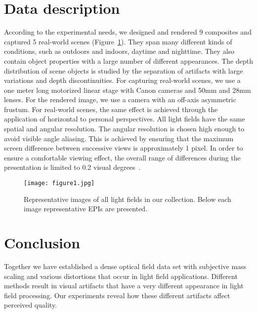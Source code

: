 \documentclass[10pt,twocolumn,letterpaper]{article}
\begin{document}
\section{Data description}
According to the experimental needs, we designed and rendered 9 composites and captured 5 real-world scenes (Figure~\ref{pic1}). They span many different kinds of conditions, such as outdoors and indoors, daytime and nighttime. They also contain object properties with a large number of different appearances. The depth distribution of scene objects is studied by the separation of artifacts with large variations and depth discontinuities. For capturing real-world scenes, we use a one meter long motorized linear stage with Canon cameras and 50mm and 28mm lenses. For the rendered image, we use a camera with an off-axis asymmetric frustum. For real-world scenes, the same effect is achieved through the application of horizontal to personal perspectives. All light fields have the same spatial and angular resolution. The angular resolution is chosen high enough to avoid visible angle aliasing. This is achieved by ensuring that the maximum screen difference between successive views is approximately 1 pixel. In order to ensure a comfortable viewing effect, the overall range of differences during the presentation is limited to 0.2 visual degrees~\cite{Shibata_2011_The}.
\begin{figure}
	\centering
	\texttt{[image: figure1.jpg]}
	\caption{Representative images of all light fields in our collection. Below each image representative EPIs are presented.}\label{pic1}
\end{figure}
\section{Conclusion}
Together we have established a dense optical field data set with subjective mass scaling and various distortions that occur in light field applications. Different methods result in visual artifacts that have a very different appearance in light field processing. Our experiments reveal how these different artifacts affect perceived quality.



{\small
	
	} 
\end{document}
